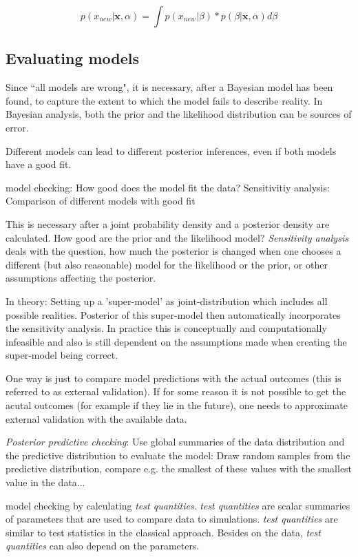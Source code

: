 \documentclass{article}
\begin{document}
\begin{equation}
p(x_{new}|\boldsymbol x, \alpha) = \int p(x_{new}|\beta) * p(\beta | \boldsymbol x,\alpha) d \beta
\label{eq:posterior_predictive}
\end{equation}

\subsection{Evaluating models}

Since ``all models are wrong", it is necessary, after a Bayesian model has been found, to capture the extent to which the model fails to describe reality. In Bayesian analysis, both the prior and the likelihood distribution can be sources of error.

Different models can lead to different posterior inferences, even if both models have a good fit.

model checking: How good does the model fit the data?
Sensitivitiy analysis: Comparison of different models with good fit

This is necessary after a joint probability density and a posterior density are calculated. How good are the prior and the likelihood model?
\textit{Sensitivity analysis} deals with the question, how much the posterior is changed when one chooses a different (but also reasonable) model for the likelihood or the prior, or other assumptions affecting the posterior.

In theory: Setting up a 'super-model' as joint-distribution which includes all possible realities. Posterior of this super-model then automatically incorporates the sensitivity analysis. In practice this is conceptually and computationally infeasible and also is still dependent on the assumptions made when creating the super-model being correct.

One way is just to compare model predictions with the actual outcomes (this is referred to as external validation). If for some reason it is not possible to get the acutal outcomes (for example if they lie in the future), one needs to approximate external validation with the available data.

\textit{Posterior predictive checking}: Use global summaries of the data distribution and the predictive distribution to evaluate the model: Draw random samples from the predictive distribution, compare e.g. the smallest of these values with the smallest value in the data...

model checking by calculating \textit{test quantities}. \textit{test quantities} are scalar summaries of parameters that are used to compare data to simulations. \textit{test quantities} are similar to test statistics in the classical approach. Besides on the data, \textit{test quantities} can also depend on the parameters.
\end{document}

